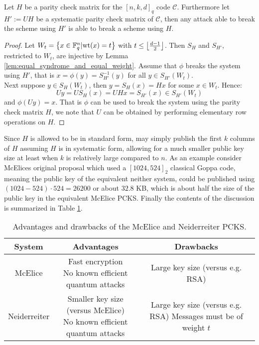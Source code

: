 \begin{proposition}\label{prop:H_can_be_in_standard_form}
  Let $H$ be a parity check matrix for the $[n, k, d]_q$ code $\mathcal{C}$. Furthermore let $H' := UH$ be a systematic parity check matrix of $\mathcal{C}$, then any attack able to break the scheme using $H'$ is able to break a scheme using $H$.
\end{proposition}
\begin{proof}
  Let $W_t = \left\{x \in \mathbb{F}_q^n | \mathrm{wt}(x) = t\right\}$ with $t \leq \left\lfloor\frac{d - 1}{2}\right\rfloor$. Then $S_H$ and $S_{H'}$, restricted to $W_{t}$, are injective by Lemma \ref{lem:equal_syndrome_and_equal_weight}. Assume that $\phi$ breaks the system using $H'$, that is $x = \phi(y) = S_{H'}^{-1}(y)$ for all $y \in S_{H'}(W_t)$. \\
  Next suppose $y \in S_{H}(W_t)$, then $y = S_{H}(x) = Hx$ for some $x \in W_t$. Hence:
  \begin{equation*}
    Uy = U S_H(x) = U H x = S_{H'}(x) \in S_{H'}(W_t)
  \end{equation*}
   and $\phi(Uy) = x$. That is $\phi$ can be used to break the system using the parity check matrix $H$, we note that $U$ can be obtained by performing elementary row operations on $H$.
\end{proof}

Since $H$ is allowed to be in standard form, may simply publish the first $k$ columns of $H$ assuming $H$ is in systematic form, allowing for a much smaller public key size at least when $k$ is relatively large compared to $n$. As an example consider McElices original proposal which used a $[1024, 524]_2$ classical Goppa code, meaning the public key of the equivalent neither system, could be published using $(1024-524) \cdot 524 = 26200$ or about $32.8$ KB, which is about half the size of the public key in the equivalent McElice PCKS. Finally the contents of the discussion is summarized in Table \ref{tab:pros_and_cons}.
\begin{table}[H]
    \centering
    \begin{tabular} {||c|c|c||}
        \hline
        \textbf{System} & \textbf{Advantages} & \textbf{Drawbacks} \\
        \hline
        McElice & \makecell{Fast encryption\\No known efficient quantum attacks}& Large key size (versus e.g. RSA) \\
        \hline

        Neiderreiter & \makecell{Smaller key size (versus McElice) \\ No known efficient quantum attacks} & \makecell{Large key size (versus e.g. RSA)\\ Messages must be of weight $t$}\\
        \hline
    \end{tabular}
    \caption{Advantages and drawbacks of the McElice and Neiderreiter PCKS.}
    \label{tab:pros_and_cons}
\end{table}
